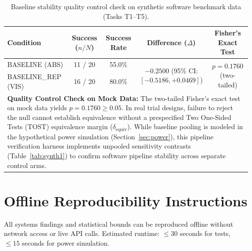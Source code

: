 \documentclass[conference]{IEEEtran}
\begin{document}
\begin{table}[ht]
\centering
\small
\caption{Baseline stability quality control check on synthetic software benchmark data (Tasks T1--T5).}
\label{tab:synth2}
\begin{tabular*}{\textwidth}{@{\extracolsep{\fill}}lcccc@{}}
\toprule
\textbf{Condition} & \textbf{Success ($n/N$)} & \textbf{Success Rate} & \textbf{Difference ($\Delta$)} & \textbf{Fisher's Exact Test} \\
\midrule
\textsc{BASELINE (ABS)}     & 11 / 20 & 55.0\% & \multirow{2}{*}{$-0.2500$ (95\% CI: $[-0.5186, +0.0469]$)} & \multirow{2}{*}{$p = 0.1760$ (two-tailed)} \\
\textsc{BASELINE\_REP (VIS)} & 16 / 20 & 80.0\% & & \\
\midrule
\multicolumn{5}{p{\dimexpr\textwidth-2\tabcolsep\relax}}{\textbf{Quality Control Check on Mock Data:} The two-tailed Fisher's exact test on mock data yields $p = 0.1760 \ge 0.05$. In real trial designs, failure to reject the null cannot establish equivalence without a prespecified Two One-Sided Tests (TOST) equivalence margin ($\delta_{\text{equiv}}$). While baseline pooling is modeled in the hypothetical power simulation (Section~\ref{sec:power}), this pipeline verification harness implements unpooled sensitivity contrasts (Table~\ref{tab:synth1}) to confirm software pipeline stability across separate control arms.} \\
\bottomrule
\end{tabular*}
\end{table}

\FloatBarrier

\section{Offline Reproducibility Instructions}
\label{app:reproduce}

All systems findings and statistical bounds can be reproduced offline without network access or live API calls. Estimated runtime: $\leq 30$ seconds for tests, $\leq 15$ seconds for power simulation.
\end{document}
